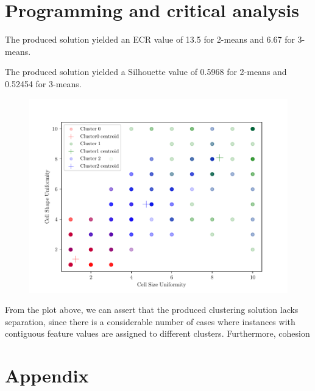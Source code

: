\documentclass{exam}
\begin{document}
    \section{Programming and critical analysis}
    \begin{questions}
        \setcounter{question}{3}
        \item \quad
        \begin{parts}
            \vspace{-1.6em}
            \item The produced solution yielded an ECR value of 13.5 for 2-means and 6.67 for 3-means.
            \item The produced solution yielded a Silhouette value of 0.5968 for 2-means and 0.52454 for 3-means. 
        \end{parts}
        \item \quad
        \begin{figure}[H]
            \centering
            \includegraphics{3means.pdf}
        \end{figure}
        \item From the plot above, we can assert that the produced clustering solution lacks separation, since there is a considerable number of cases where instances with contiguous feature values are assigned to different clusters. Furthermore, cohesion 
    \end{questions}

    \pagebreak
    \section{Appendix}
    \inputminted{python}{src/part02.py}
   
    
    
\end{document}
